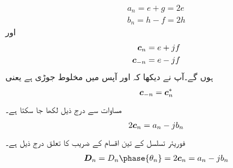 \begin{align*}
a_n=e+g=2e\\
b_n=h-f=2h
\end{align*}
اور
\begin{align*}
{\ensuremath{{\boldsymbol{c}}}}_n&=e+jf\\
{{\boldsymbol{c}}}_{-n}&=e-jf
\end{align*}
ہوں گے۔آپ نے دیکھا کہ  اور  آپس میں مخلوط جوڑی ہے یعنی
\begin{align}
{\ensuremath{{\boldsymbol{c}}}}_{-n}={{\boldsymbol{c}}}^*_n
\end{align}
مساوات  سے درج ذیل لکھا جا سکتا ہے۔
\begin{align}
2{{\boldsymbol{c}}}_n=a_n-jb_n
\end{align}
فوریئر تسلسل کے تین اقسام کے  ضریب  کا تعلق درج ذیل ہے۔
\begin{align}
\kx{D}_n=D_n\phase{\theta_n}=2\kx{c}_n=a_n-jb_n
\end{align}

